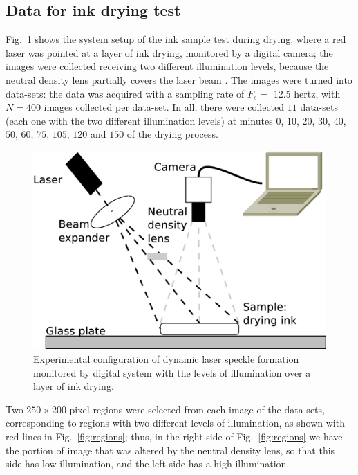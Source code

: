\documentclass[review]{elsarticle}
\begin{document}
\subsection{Data for ink drying test}
\label{sec:descriptionink}
Fig.~\ref{fig:system} shows the system setup of the ink sample test during drying, where
a red laser was pointed at a layer of ink drying, monitored by a digital camera;
the images were collected receiving two different illumination levels, 
because the neutral density lens partially covers the laser beam \cite{REIS2016}.
The images were turned into data-sets:
the data was acquired with a sampling rate of $F_s=$ 12.5 hertz, with 
$N=400$ images collected per data-set. In all, there were collected $11$ data-sets 
(each one with the two different illumination levels) at minutes 
$0$, $10$, $20$, $30$, $40$, $50$, $60$, $75$, $105$, $120$ and $150$ of the drying process.
\begin{figure}[ht!]
\centering
\includegraphics[width=0.65\columnwidth]{system.eps}
\caption{Experimental configuration of dynamic laser speckle formation monitored by digital system 
with the levels of illumination over a layer of ink drying.}
\label{fig:system}
\end{figure}
Two $250\times200$-pixel regions were selected from each image of the data-sets, 
corresponding to regions with two different levels of illumination, 
as shown with red lines in Fig.~\ref{fig:regions}; thus, 
in the right side of Fig.~\ref{fig:regions}  we have the
portion of image that was altered by the neutral density lens,
 so that this side has low illumination, and
the left side has a high illumination.
\end{document}
